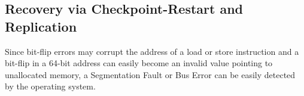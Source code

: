 \documentclass{sig-alternate}
\begin{document}
{%
%
%
%
%

\subsection{Recovery via Checkpoint-Restart and \\Replication}
\label{sec:res_tech:cr}
Since bit-flip errors may corrupt the address of a load or store instruction and a bit-flip in a 64-bit address can easily become an invalid value pointing to
unallocated memory, a Segmentation Fault or Bus Error can be easily detected by the operating system.\\

}
\end{document}
